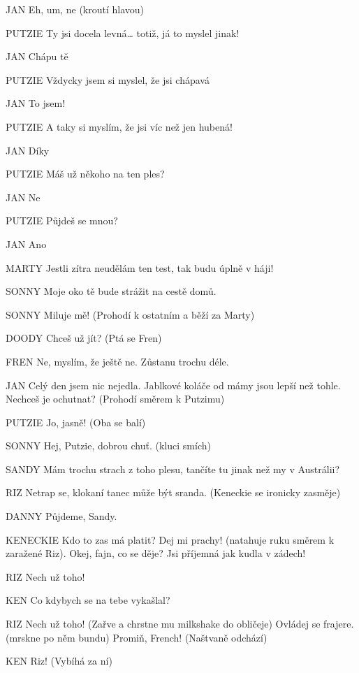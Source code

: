 JAN        Eh, um, ne (kroutí hlavou) 

PUTZIE         Ty jsi docela levná… totiž, já to myslel jinak! 

JAN        Chápu tě 

PUTZIE        Vždycky jsem si myslel, že jsi chápavá 

JAN        To jsem! 

PUTZIE        A taky si myslím, že jsi víc než jen hubená!

JAN        Díky 

PUTZIE         Máš už někoho na ten ples? 

JAN        Ne

PUTZIE        Půjdeš se mnou? 

JAN        Ano 

MARTY        Jestli zítra neudělám ten test, tak budu úplně v háji!

SONNY        Moje oko tě bude strážit na cestě domů. 

SONNY        Miluje mě! (Prohodí k ostatním a běží za Marty) 

DOODY        Chceš už jít? (Ptá se Fren)

FREN        Ne, myslím, že ještě ne. Zůstanu trochu déle. 

JAN        Celý den jsem nic nejedla. Jablkové koláče od mámy jsou lepší než                 tohle. Nechceš je ochutnat? (Prohodí směrem k Putzimu) 

PUTZIE         Jo, jasně! (Oba se balí) 

SONNY        Hej, Putzie, dobrou chuť. (kluci smích)

SANDY        Mám trochu strach z toho plesu, tančíte tu jinak než my v Austrálii? 

RIZ                Netrap se, klokaní tanec může být sranda. (Keneckie se ironicky                 zasměje) 

DANNY        Půjdeme, Sandy. 

KENECKIE        Kdo to zas má platit? Dej mi prachy! (natahuje ruku směrem k zaražené         Riz). Okej, fajn, co se děje? Jsi příjemná jak kudla v zádech! 

RIZ                Nech už toho! 

KEN        Co kdybych se na tebe vykašlal? 

RIZ                Nech už toho! (Zařve a chrstne mu milkshake do obličeje) Ovládej se         frajere. (mrskne po něm bundu) Promiň, French! (Naštvaně odchází)

KEN         Riz! (Vybíhá za ní) 

